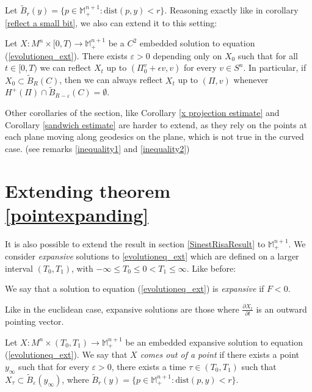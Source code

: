 Let $\tilde{B}_r(y) = \{ p \in \mathbb{M}^{n+1}_+  : \mathrm{dist}(p, y) < r \}$. Reasoning exactly like in corollary \ref{reflect a small bit}, we also can extend it to this setting:  
\begin{cor}
	Let $X:M^n\times [0,T) \rightarrow \mathbb{M}^{n+1}_+$ be a $C^2$ embedded solution to equation (\ref{evolutioneq_ext}). There exists $\varepsilon>0$ depending only on $X_0$ such that for all $t\in[0, T)$ we can reflect $X_t$ up to $(\Pi_0^v +\epsilon v, v)$ for every $v \in S^n$. In particular, if $X_0 \subset \tilde{B}_R(C)$, then we can always reflect $X_t$ up to $(\Pi, v)$ whenever $H^+(\Pi)\cap \tilde{B}_{R-\varepsilon}(C)=\emptyset$.\label{reflect a small bit ext}
\end{cor}
Other corollaries of the section, like Corollary \ref{x projection estimate} and Corollary \ref{sandwich estimate} are harder to extend, as they rely on the points at each plane moving along geodesics on the plane, which is not true in the curved case. (see remarks \ref{inequality1} and \ref{inequality2})
\begin{comment}
{\Large \textbf{[Corollary \ref{x projection estimate} - If/when it can be done  - DA SCRIVERE]}}

{\Large \textbf{[Corollary \ref{sandwich estimate} - If/when it can be done  - DA SCRIVERE]}} I fear that this one cannot be done because the line mapping the minimum into the maximum in the reflection is not a geodesic anymore in the hyperbolic case
\end{comment}


\section{Extending theorem \ref{pointexpanding}}

It is also possible to extend the result in section \ref{SinestRisaResult} to $\mathbb{M}^{n+1}_+$. We consider {\em expansive} solutions to \ref{evolutioneq_ext} which are defined on a larger interval $(T_0, T_1)$, with  $-\infty \leq T_0 \leq 0 < T_1 \leq \infty$. Like before: 
\begin{defin}
	We say that a solution to equation (\ref{evolutioneq_ext}) is {\em expansive} if $F<0$. 
\end{defin}
Like in the euclidean case, expansive solutions are those where $\frac{\partial X_t}{\partial t}$ is an outward pointing vector. 
\begin{defin}
	Let $ X : M^n \times (T_0, T_1) \to \mathbb{M}^{n+1}_+ $ be an embedded expansive solution to equation (\ref{evolutioneq_ext}). We say that {\em $X$ comes out of a point} if there exists a point $y_\infty$ such that for every $\varepsilon>0$, there exists a time $\tau \in  (T_0, T_1)$ such that $X_\tau \subset \tilde{B}_\varepsilon(y_\infty)$, where $\tilde{B}_r(y) = \{ p \in \mathbb{M}^{n+1}_+  : \mathrm{dist}(p, y) < r \}$.
\end{defin}


